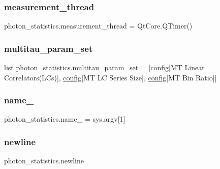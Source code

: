 \subsubsection{\texorpdfstring{measurement\+\_\+thread}{measurement\_thread}}
{\footnotesize\ttfamily photon\+\_\+statistics.\+measurement\+\_\+thread = Qt\+Core.\+Q\+Timer()}

\mbox{\label{namespacephoton__statistics_a3c57d728c4b1cdcb2b6ca63bc6adfc4d}} 
\subsubsection{\texorpdfstring{multitau\+\_\+param\+\_\+set}{multitau\_param\_set}}
{\footnotesize\ttfamily list photon\+\_\+statistics.\+multitau\+\_\+param\+\_\+set = \mbox{[}\hyperlink{namespacephoton__statistics_a4176c548148b1c86da6ddf320ab00e90}{config}\mbox{[}\textquotesingle{}MT Linear Correlators(L\+Cs)\textquotesingle{}\mbox{]}, \hyperlink{namespacephoton__statistics_a4176c548148b1c86da6ddf320ab00e90}{config}\mbox{[}\textquotesingle{}MT LC Series Size\textquotesingle{}\mbox{]}, \hyperlink{namespacephoton__statistics_a4176c548148b1c86da6ddf320ab00e90}{config}\mbox{[}\textquotesingle{}MT Bin Ratio\textquotesingle{}\mbox{]}\mbox{]}}

\mbox{\label{namespacephoton__statistics_a729c361165a662402f88b585477d2ee6}} 
\subsubsection{\texorpdfstring{name\+\_\+}{name\_}}
{\footnotesize\ttfamily photon\+\_\+statistics.\+name\+\_\+ = sys.\+argv\mbox{[}1\mbox{]}}

\mbox{\label{namespacephoton__statistics_a6c6d01b62f113634193642d2dda3124a}} 
\subsubsection{\texorpdfstring{newline}{newline}}
{\footnotesize\ttfamily photon\+\_\+statistics.\+newline}

